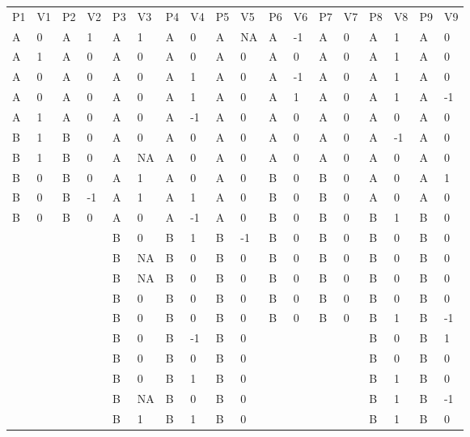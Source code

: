 \documentclass{article}
\begin{document}
\begin{table}

  
\begin{tabular}{l  l  l  l  l  l  l  l  l  l  l  l  l  l  l  l  l  l}

  P1 & V1 & P2 & V2 & P3 & V3 & P4 & V4 & P5 & V5 & P6 & V6 & P7 & V7 & P8 & V8 & P9 & V9\\
A & 0 & A & 1 & A & 1 & A & 0 & A & NA & A & -1 & A & 0 & A & 1 & A & 0\\
A & 1 & A & 0 & A & 0 & A & 0 & A & 0 & A & 0 & A & 0 & A & 1 & A & 0\\
A & 0 & A & 0 & A & 0 & A & 1 & A & 0 & A & -1 & A & 0 & A & 1 & A & 0\\
A & 0 & A & 0 & A & 0 & A & 1 & A & 0 & A & 1 & A & 0 & A & 1 & A & -1\\
A & 1 & A & 0 & A & 0 & A & -1 & A & 0 & A & 0 & A & 0 & A & 0 & A & 0\\
B & 1 & B & 0 & A & 0 & A & 0 & A & 0 & A & 0 & A & 0 & A & -1 & A & 0\\
B & 1 & B & 0 & A & NA & A & 0 & A & 0 & A & 0 & A & 0 & A & 0 & A & 0\\
B & 0 & B & 0 & A & 1 & A & 0 & A & 0 & B & 0 & B & 0 & A & 0 & A & 1\\
B & 0 & B & -1 & A & 1 & A & 1 & A & 0 & B & 0 & B & 0 & A & 0 & A & 0\\
B & 0 & B & 0 & A & 0 & A & -1 & A & 0 & B & 0 & B & 0 & B & 1 & B & 0\\
  &   &   &   & B & 0 & B & 1 & B & -1 & B & 0 & B & 0 & B & 0 & B & 0\\
  &   &   &   & B & NA & B & 0 & B & 0 & B & 0 & B & 0 & B & 0 & B & 0\\
  &   &   &   & B & NA & B & 0 & B & 0 & B & 0 & B & 0 & B & 0 & B & 0\\
  &   &   &   & B & 0 & B & 0 & B & 0 & B & 0 & B & 0 & B & 0 & B & 0\\
  &   &   &   & B & 0 & B & 0 & B & 0 & B & 0 & B & 0 & B & 1 & B & -1\\
  &   &   &   & B & 0 & B & -1 & B & 0 &   &   &   &   & B & 0 & B & 1\\
  &   &   &   & B & 0 & B & 0 & B & 0 &   &   &   &   & B & 0 & B & 0\\
  &   &   &   & B & 0 & B & 1 & B & 0 &   &   &   &   & B & 1 & B & 0\\
  &   &   &   & B & NA & B & 0 & B & 0 &   &   &   &   & B & 1 & B & -1\\
  &   &   &   & B & 1 & B & 1 & B & 0 &   &   &   &   & B & 1 & B & 0\\

\end{tabular}
\end{table}
\end{document}
